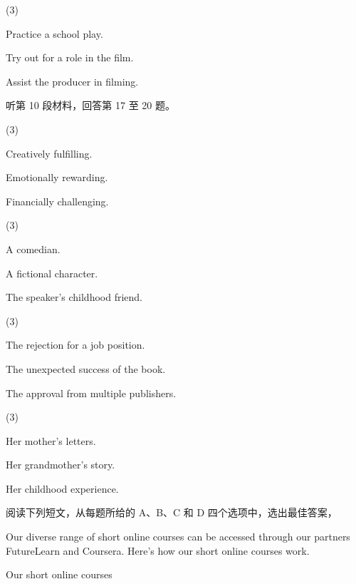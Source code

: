 \documentclass{英语试卷}
\begin{document}
\begin{choices}(3)
  \item Practice a school play.
  \item Try out for a role in the film.
  \item Assist the producer in filming.
\end{choices}
\par 听第 10 段材料，回答第 17 至 20 题。\par
{}
\begin{choices}(3)
  \item Creatively fulfilling.
  \item Emotionally rewarding.
  \item Financially challenging.
\end{choices}
\begin{choices}(3)
  \item A comedian.
  \item A fictional character.
  \item The speaker's childhood friend.
\end{choices}
\begin{choices}(3)
  \item The rejection for a job position.
  \item The unexpected success of the book.
  \item The approval from multiple publishers.
\end{choices}
\begin{choices}(3)
  \item Her mother's letters.
  \item Her grandmother's story.
  \item Her childhood experience.
\end{choices}
\par 阅读下列短文，从每题所给的 A、B、C 和 D 四个选项中，选出最佳答案，\par
{}
\par Our diverse range of short online courses can be accessed through our partners FutureLearn and Coursera. Here's how our short online courses work.\par
\par Our short online courses\par
\end{document}
